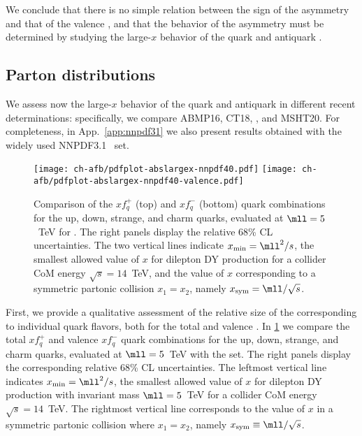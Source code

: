 We conclude that there
is no simple relation between the sign of the asymmetry and that of
the valence \pdf, and that the
behavior of the asymmetry must be determined by studying the large-$x$
behavior of the quark and antiquark \pdfs.

\subsection{Parton distributions}
\label{sec:afb/subsec-largexPDFs}

We assess now the large-$x$ behavior of
the quark and antiquark \pdfs in different recent \pdf
determinations: specifically, we compare
 ABMP16,
 CT18,  ,
 and MSHT20.
%
 For
completeness, in App.~\ref{app:nnpdf31} we also present results
obtained with the widely used NNPDF3.1~\cite{Ball:2017nwa} set.

\begin{figure}[!t]
 \centering
 \texttt{[image: ch-afb/pdfplot-abslargex-nnpdf40.pdf]}
 \texttt{[image: ch-afb/pdfplot-abslargex-nnpdf40-valence.pdf]}
 \caption{\small Comparison of the $xf^+_q$ (top) and $xf_q^-$ (bottom) quark
   \pdf combinations for the up, down, strange, and charm quarks,
   evaluated at $\mll=5$~TeV for  \nnlo.
   The right panels display the relative 68\% CL uncertainties.
   The two vertical lines indicate $x_{\rm min}=\mll^2/s$, the
   smallest allowed value of $x$ 
   for dilepton DY production for a collider
   CoM energy $\sqrt{s}=14$~TeV, and the value of $x$
   corresponding to a symmetric partonic collision $x_1=x_2$, namely
 $x_{\rm  sym}=\mll/\sqrt{s}$.
 }    
 \label{fig:afb/pdfplot-abslargex}
\end{figure}

First, we provide a qualitative assessment of the relative size of the
\pdfs corresponding to
individual quark flavors, both for the total and valence \pdfs.
In \cref{fig:afb/pdfplot-abslargex} we
compare  the total $xf^+_q$ and valence $xf_q^-$  quark
   \pdf combinations for the up, down, strange, and charm quarks,
   evaluated at $\mll=5$~TeV with the  \nnlo \pdf set.
   The right panels display the corresponding relative 68\% CL uncertainties.
  The leftmost vertical line indicates $x_{\rm min}=\mll^2/s$, the
  smallest allowed value of $x$ 
   for dilepton DY production with invariant mass $\mll=5$~TeV for a collider
   CoM energy $\sqrt{s}=14$~TeV.
   The rightmost vertical line corresponds to
   the value of $x$ in a symmetric partonic collision where $x_1=x_2$, namely
   $x_{\rm  sym}\equiv\mll/\sqrt{s}$.

